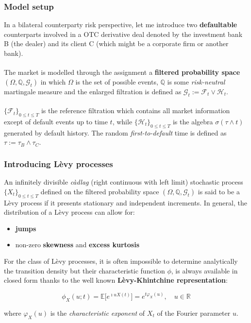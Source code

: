 \documentclass{beamer}
\begin{document}
\begin{frame}
\frametitle{Model setup}
	In a bilateral counterparty risk perspective, let me introduce two \textbf{defaultable} counterparts involved in a OTC derivative deal denoted by the investment bank B (the dealer) and its client C (which might be a corporate firm or another bank).\\~\\
	
	The market is modelled through the assignment a \textbf{filtered probability space} $(\Omega,\mathbb{Q},\mathcal{G}_t)$ in which $\Omega$ is the set of possible events, $\mathbb{Q}$ is some \emph{risk-neutral} martingale measure and the enlarged filtration is defined as $\mathcal{G}_t := \mathcal{F}_t \vee \mathcal{H}_t$. \\~\\

	$ \{ \mathcal{F}_t \}_{0 \leq t \leq T}$ is the reference filtration which contains all market information except of default events up to time $t$, while $ \{ \mathcal{H}_t \}_{0 \leq t \leq T}$ is the algebra $\sigma(\tau \wedge t)$ generated by default history. The random \emph{first-to-default} time is defined as $\tau  := \tau_{B} \wedge \tau_{C}$. 

\end{frame}

\begin{frame}
\frametitle{Introducing Lèvy processes}
	An infinitely divisible \emph{càdlag} (right continuous with left limit) stochastic process $\{ X_t \}_{0 \leq t \leq T}$ defined on the filtered probability space $(\Omega,\mathbb{Q},\mathcal{G}_t)$ is said to be a Lèvy process if it %
  	presents stationary and independent increments. In general, the distribution of a Lèvy process can allow for:
  	\begin{itemize}
  		\item \textbf{jumps}
  		\item non-zero \textbf{skewness} and \textbf{excess kurtosis}
  	\end{itemize}  
  	
	For the class of Lèvy processes, it is often impossible to determine analytically the transition density but their characteristic function $\phi$, is always available in closed form thanks to the well known \textbf{Lèvy-Khintchine representation}:

	\begin{equation}
	\phi_{X}(u;t)= \mathbb{E} \lbrack e^{\imath u X(t)} \rbrack = e^{t \varphi_{X}(u)}, \quad u \in \mathbb{R}
	\end{equation} 
	
	where $\varphi_{X}(u)$ is the \emph{characteristic exponent} of $X_{t}$ of the Fourier parameter $u$.
\end{frame}
\end{document}
